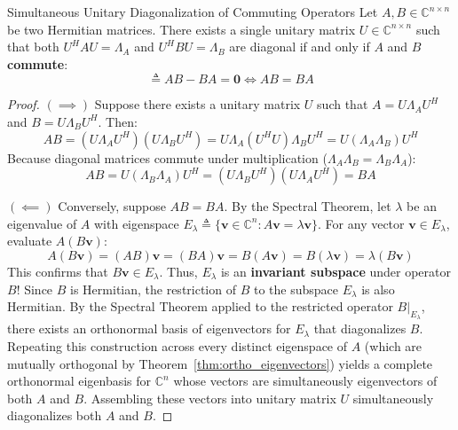 \begin{theorembox}{Simultaneous Unitary Diagonalization of Commuting Operators}
\label{thm:simultaneous_diag}
Let $A, B \in \mathbb{C}^{n \times n}$ be two Hermitian matrices. There exists a single unitary matrix $U \in \mathbb{C}^{n \times n}$ such that both $U^H A U = \Lambda_A$ and $U^H B U = \Lambda_B$ are diagonal if and only if $A$ and $B$ \textbf{commute}:
\begin{equation}
[A, B] \triangleq AB - BA = \mathbf{0} \iff AB = BA
\label{eq:commutator_zero}
\end{equation}
\end{theorembox}

\begin{proof}
$(\implies)$ Suppose there exists a unitary matrix $U$ such that $A = U \Lambda_A U^H$ and $B = U \Lambda_B U^H$.
Then:
\begin{equation}
AB = (U \Lambda_A U^H)(U \Lambda_B U^H) = U \Lambda_A (U^H U) \Lambda_B U^H = U (\Lambda_A \Lambda_B) U^H
\end{equation}
Because diagonal matrices commute under multiplication ($\Lambda_A \Lambda_B = \Lambda_B \Lambda_A$):
\begin{equation}
AB = U (\Lambda_B \Lambda_A) U^H = (U \Lambda_B U^H)(U \Lambda_A U^H) = BA
\end{equation}

$(\impliedby)$ Conversely, suppose $AB = BA$.
By the Spectral Theorem, let $\lambda$ be an eigenvalue of $A$ with eigenspace $E_\lambda \triangleq \{\mathbf{v} \in \mathbb{C}^n : A\mathbf{v} = \lambda \mathbf{v}\}$.
For any vector $\mathbf{v} \in E_\lambda$, evaluate $A(B\mathbf{v})$:
\begin{equation}
A(B\mathbf{v}) = (AB)\mathbf{v} = (BA)\mathbf{v} = B(A\mathbf{v}) = B(\lambda \mathbf{v}) = \lambda (B\mathbf{v})
\end{equation}
This confirms that $B\mathbf{v} \in E_\lambda$. Thus, $E_\lambda$ is an \textbf{invariant subspace} under operator $B$!
Since $B$ is Hermitian, the restriction of $B$ to the subspace $E_\lambda$ is also Hermitian.
By the Spectral Theorem applied to the restricted operator $B|_{E_\lambda}$, there exists an orthonormal basis of eigenvectors for $E_\lambda$ that diagonalizes $B$.
Repeating this construction across every distinct eigenspace of $A$ (which are mutually orthogonal by Theorem~\ref{thm:ortho_eigenvectors}) yields a complete orthonormal eigenbasis for $\mathbb{C}^n$ whose vectors are simultaneously eigenvectors of both $A$ and $B$.
Assembling these vectors into unitary matrix $U$ simultaneously diagonalizes both $A$ and $B$.
\end{proof}

